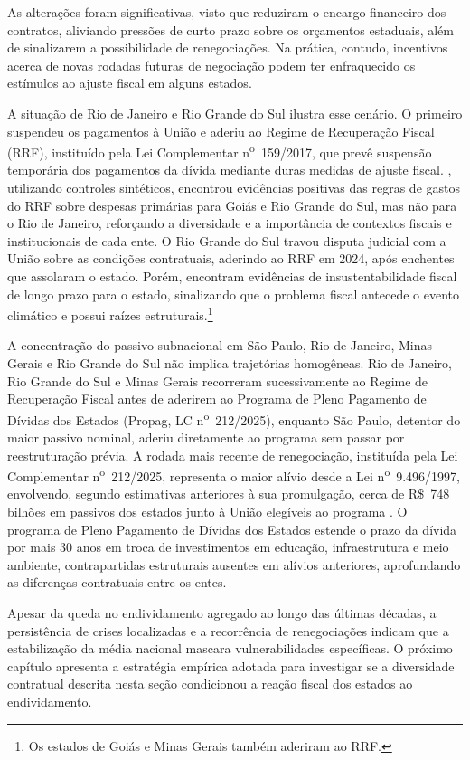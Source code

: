 As alterações foram significativas, visto que reduziram o encargo financeiro dos contratos, aliviando pressões de curto prazo sobre os orçamentos estaduais, além de sinalizarem a possibilidade de renegociações. Na prática, contudo, incentivos acerca de novas rodadas futuras de negociação podem ter enfraquecido os estímulos ao ajuste fiscal em alguns estados.

A situação de Rio de Janeiro e Rio Grande do Sul ilustra esse cenário. O primeiro suspendeu os pagamentos à União e aderiu ao Regime de Recuperação Fiscal (RRF), instituído pela Lei Complementar n\textsuperscript{o}~159/2017, que prevê suspensão temporária dos pagamentos da dívida mediante duras medidas de ajuste fiscal. , utilizando controles sintéticos, encontrou evidências positivas das regras de gastos do RRF sobre despesas primárias para Goiás e Rio Grande do Sul, mas não para o Rio de Janeiro, reforçando a diversidade e a importância de contextos fiscais e institucionais de cada ente. O Rio Grande do Sul travou disputa judicial com a União sobre as condições contratuais, aderindo ao RRF em 2024, após enchentes que assolaram o estado. Porém,  encontram evidências de insustentabilidade fiscal de longo prazo para o estado, sinalizando que o problema fiscal antecede o evento climático e possui raízes estruturais.\footnote{Os estados de Goiás e Minas Gerais também aderiram ao RRF.}

A concentração do passivo subnacional em São Paulo, Rio de Janeiro, Minas Gerais e Rio Grande do Sul não implica trajetórias homogêneas. Rio de Janeiro, Rio Grande do Sul e Minas Gerais recorreram sucessivamente ao Regime de Recuperação Fiscal antes de aderirem ao Programa de Pleno Pagamento de Dívidas dos Estados (Propag, LC n\textsuperscript{o}~212/2025), enquanto São Paulo, detentor do maior passivo nominal, aderiu diretamente ao programa sem passar por reestruturação prévia. A rodada mais recente de renegociação, instituída pela Lei Complementar n\textsuperscript{o}~212/2025, representa o maior alívio desde a Lei n\textsuperscript{o}~9.496/1997, envolvendo, segundo estimativas anteriores à sua promulgação, cerca de R\$~748 bilhões em passivos dos estados junto à União elegíveis ao programa \cite{NovaRenegociacaoDivida2024}. O programa de Pleno Pagamento de Dívidas dos Estados estende o prazo da dívida por mais 30 anos em troca de investimentos em educação, infraestrutura e meio ambiente, contrapartidas estruturais ausentes em alívios anteriores, aprofundando as diferenças contratuais entre os entes.

Apesar da queda no endividamento agregado ao longo das últimas décadas, a persistência de crises localizadas e a recorrência de renegociações indicam que a estabilização da média nacional mascara vulnerabilidades específicas. O próximo capítulo apresenta a estratégia empírica adotada para investigar se a diversidade contratual descrita nesta seção condicionou a reação fiscal dos estados ao endividamento.